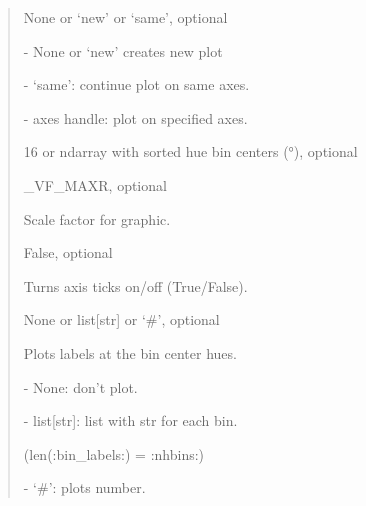 \documentclass[letterpaper,10pt,english]{sphinxmanual}
\begin{document}
\begin{fulllineitems}
\begin{description}
\begin{quote}
\begin{description}
\item[{ax}] \leavevmode
\begin{DUlineblock}{0em}
\item[] None or ‘new’ or ‘same’, optional
\item[]
\begin{DUlineblock}{\DUlineblockindent}
\item[] - None or ‘new’ creates new plot
\item[] - ‘same’: continue plot on same axes.
\item[] - axes handle: plot on specified axes.
\end{DUlineblock}
\end{DUlineblock}

\item[{hbins}] \leavevmode
\begin{DUlineblock}{0em}
\item[] 16 or ndarray with sorted hue bin centers (°), optional
\end{DUlineblock}

\item[{start\_hue}] \leavevmode
\begin{DUlineblock}{0em}
\item[] \_VF\_MAXR, optional
\item[] Scale factor for graphic.
\end{DUlineblock}

\item[{plot\_axis\_labels}] \leavevmode
\begin{DUlineblock}{0em}
\item[] False, optional
\item[] Turns axis ticks on/off (True/False).
\end{DUlineblock}

\item[{bin\_labels}] \leavevmode
\begin{DUlineblock}{0em}
\item[] None or list{[}str{]} or ‘\#’, optional
\item[] Plots labels at the bin center hues.
\item[]
\begin{DUlineblock}{\DUlineblockindent}
\item[] - None: don’t plot.
\item[] - list{[}str{]}: list with str for each bin. 
\item[]
\begin{DUlineblock}{\DUlineblockindent}
\item[] (len(:bin\_labels:) = :nhbins:)
\end{DUlineblock}
\item[] - ‘\#’: plots number.
\end{DUlineblock}
\end{DUlineblock}


\end{description}
\end{quote}
\end{description}
\end{fulllineitems}
\end{document}
